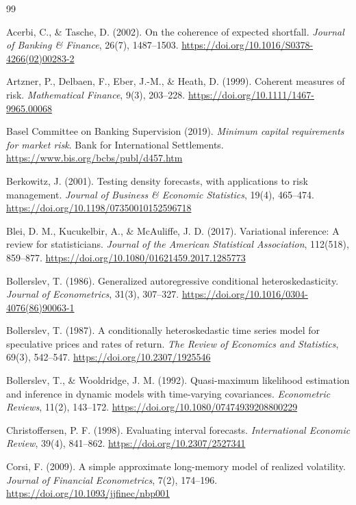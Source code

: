 \documentclass[12pt,a4paper]{article}
\theoremstyle{definition}
\theoremstyle{remark}
\begin{document}
\renewcommand{\refname}{Tài liệu tham khảo}
\begin{thebibliography}{99}
\setlength{\itemsep}{2pt}

 Acerbi, C., \& Tasche, D. (2002). On the coherence of expected shortfall. \emph{Journal of Banking \& Finance}, 26(7), 1487--1503. \url{https://doi.org/10.1016/S0378-4266(02)00283-2}

 Artzner, P., Delbaen, F., Eber, J.-M., \& Heath, D. (1999). Coherent measures of risk. \emph{Mathematical Finance}, 9(3), 203--228. \url{https://doi.org/10.1111/1467-9965.00068}

 Basel Committee on Banking Supervision (2019). \emph{Minimum capital requirements for market risk}. Bank for International Settlements. \url{https://www.bis.org/bcbs/publ/d457.htm}

 Berkowitz, J. (2001). Testing density forecasts, with applications to risk management. \emph{Journal of Business \& Economic Statistics}, 19(4), 465--474. \url{https://doi.org/10.1198/07350010152596718}

 Blei, D. M., Kucukelbir, A., \& McAuliffe, J. D. (2017). Variational inference: A review for statisticians. \emph{Journal of the American Statistical Association}, 112(518), 859--877. \url{https://doi.org/10.1080/01621459.2017.1285773}

 Bollerslev, T. (1986). Generalized autoregressive conditional heteroskedasticity. \emph{Journal of Econometrics}, 31(3), 307--327. \url{https://doi.org/10.1016/0304-4076(86)90063-1}

 Bollerslev, T. (1987). A conditionally heteroskedastic time series model for speculative prices and rates of return. \emph{The Review of Economics and Statistics}, 69(3), 542--547. \url{https://doi.org/10.2307/1925546}

 Bollerslev, T., \& Wooldridge, J. M. (1992). Quasi-maximum likelihood estimation and inference in dynamic models with time-varying covariances. \emph{Econometric Reviews}, 11(2), 143--172. \url{https://doi.org/10.1080/07474939208800229}

 Christoffersen, P. F. (1998). Evaluating interval forecasts. \emph{International Economic Review}, 39(4), 841--862. \url{https://doi.org/10.2307/2527341}

 Corsi, F. (2009). A simple approximate long-memory model of realized volatility. \emph{Journal of Financial Econometrics}, 7(2), 174--196. \url{https://doi.org/10.1093/jjfinec/nbp001}


\end{thebibliography}
\end{document}
